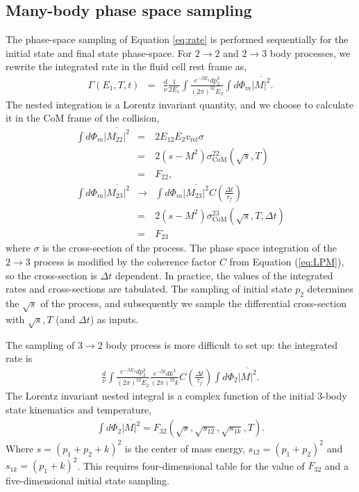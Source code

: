 \documentclass[aps, prc, reprint, amsmath, groupedaddress, nofootinbib]{revtex4-1}
\begin{document}
\begin{appendices}
\section{Many-body phase space sampling}
\label{appendix:sample}
The phase-space sampling of Equation \ref{eq:rate} is performed sequentially for the initial state and final state phase-space.
For $2\rightarrow 2$ and $2\rightarrow 3$ body processes, we rewrite the integrated rate in the fluid cell rest frame as,
\begin{eqnarray}
\Gamma(E_1, T, t) &=& \frac{d}{\nu} \frac{1}{2E_1}\int \frac{e^{-\beta E_2}dp_2^3}{(2\pi)^32E_2} 
\int d\Phi_m\overline{|M|^2}.
\end{eqnarray}
The nested integration is a Lorentz invariant quantity, and we choose to calculate it in the CoM frame of the collision, 
\begin{eqnarray}
\int d\Phi_m\overline{|M_{22}|^2} &=& 2E_12E_2v_{\textrm{rel}}\sigma \nonumber \\
 &=& 2(s-M^2)\sigma_{\textrm{CoM}}^{22}(\sqrt{s}, T)\nonumber \\
  &=& F_{22},\\
\int d\Phi_m\overline{|M_{23}|^2} &\rightarrow& \int d\Phi_m\overline{|M_{23}|^2} C\left(\frac{\Delta t}{\tau_f}\right) \nonumber \\
 &=& 2(s-M^2)\sigma_{\textrm{CoM}}^{23}(\sqrt{s}, T, \Delta t)\nonumber \\
 &=& F_{23}
\end{eqnarray}
where $\sigma$ is the cross-section of the process.
The phase space integration of the $2\rightarrow 3$ process is modified by the coherence factor $C$ from Equation (\ref{eq:LPM}), so the cross-section is $\Delta t$ dependent.
In practice, the values of the integrated rates and cross-sections are tabulated. 
The sampling of initial state $p_2$ determines the $\sqrt{s}$ of the process, and subsequently we sample the differential cross-section with $\sqrt{s}, T$ (and $\Delta t$) as inputs.

The sampling of $3\rightarrow 2$ body process is more difficult to set up:
the integrated rate is
\begin{eqnarray}
\frac{d}{\nu} \int \frac{e^{-\beta E_2}dp_2^3}{(2\pi)^32E_2} \frac{e^{-\beta k}dk^3}{(2\pi)^32k}C\left(\frac{\Delta t}{\tau_f}\right)
\int d\Phi_2\overline{|M|^2}.
\end{eqnarray}
The Lorentz invariant nested integral is a complex function of the initial 3-body state kinematics and temperature,
\begin{eqnarray}
\int d\Phi_2\overline{|M|^2} = F_{32}(\sqrt{s}, \sqrt{s_{12}}, \sqrt{s_{1k}}, T).
\end{eqnarray}
Where $s = (p_1+p_2+k)^2$ is the center of mass energy, $s_{12} = (p_1+p_2)^2$ and $s_{1k} = (p_1+k)^2$.
This requires four-dimensional table for the value of $F_{32}$ and a five-dimensional initial state sampling.


\end{appendices}
\end{document}
